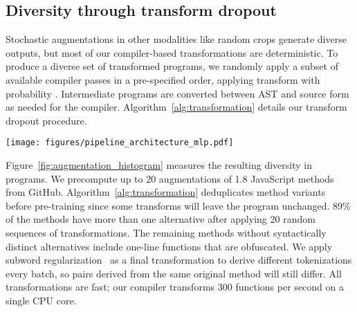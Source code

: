\documentclass[11pt]{article}
\newcommand{\million}[0]{}
\newcommand{\ours}[0]{ContraCode}
\begin{document}
\subsection{Diversity through transform dropout} \label{sec:diverse_aug}

Stochastic augmentations in other modalities like random crops generate diverse outputs, but most of our compiler-based transformations are deterministic. To produce a diverse set of transformed programs, we randomly apply a subset of available compiler passes in a pre-specified order, applying transform  with probability . Intermediate programs are converted between AST and source form as needed for the compiler. Algorithm~\ref{alg:transformation} details our transform dropout procedure.

\begin{figure*}[t]
    \centering
    \texttt{[image: figures/pipeline\_architecture\_mlp.pdf]}
    \caption{\ours{} pre-trains a neural program encoder  and transfers it to downstream tasks. \textbf{A-B.} Unlabeled programs are transformed \textbf{C.} into augmented variants. \textbf{D.} We pre-train  by maximizing similarity of projected embeddings of \textit{positive} program pairs--variants of the same program--and minimizing similarity with a queue of cached negatives. \textbf{E.} \ours{} supports any architecture for  that produces a global program embedding such as Transformers and LSTMs.  is then fine-tuned on smaller labeled datasets.}
    \label{fig:training}
\end{figure*}

Figure~\ref{fig:augmentation_histogram} measures the resulting diversity in programs. We precompute up to 20 augmentations of 1.8\million{} JavaScript methods from GitHub. Algorithm~\ref{alg:transformation} deduplicates method variants before pre-training since some transforms will leave the program unchanged. 89\% of the methods have more than one alternative after applying 20 random sequences of transformations.
The remaining methods without syntactically distinct alternatives include one-line functions that are obfuscated.
We apply subword regularization~\citep{kudo2018subword} as a final transformation to derive different tokenizations every batch, so pairs derived from the same original method will still differ.
All transformations are fast; our compiler transforms 300 functions per second on a single CPU core.
\end{document}
